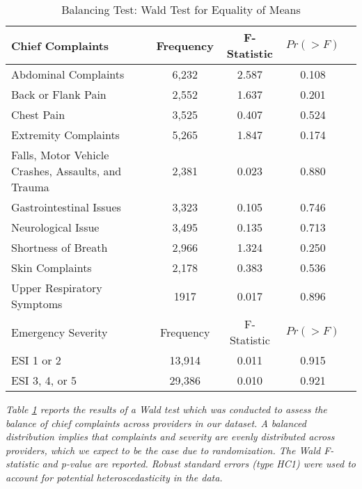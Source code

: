 \documentclass[,mnsc,nonblindrev]{informs}
\begin{document}
\begin{table}[ht]
    \centering
    \caption{Balancing Test: Wald Test for Equality of Means}
    \label{tab:wald_test}
    \begin{threeparttable}
    \begin{tabular}{lcccc}
        \toprule
        Chief Complaints & Frequency & F-Statistic & $Pr(> F)$ \\
        \midrule
        Abdominal Complaints & 6,232 & 2.587 & 0.108 \\ 
        Back or Flank Pain & 2,552 & 1.637 & 0.201 \\ 
        Chest Pain & 3,525 & 0.407 & 0.524 \\ 
        Extremity Complaints & 5,265 & 1.847 & 0.174 \\ 
        Falls, Motor Vehicle Crashes, Assaults, and Trauma & 2,381 & 0.023 & 0.880 \\ 
        Gastrointestinal Issues & 3,323 & 0.105 & 0.746 \\ 
        Neurological Issue & 3,495 & 0.135 & 0.713 \\ 
        Shortness of Breath & 2,966 & 1.324 & 0.250 \\ 
        Skin Complaints & 2,178 & 0.383 & 0.536 \\ 
        Upper Respiratory Symptoms & 1917 & 0.017 & 0.896 \\ 
        \midrule
        Emergency Severity & Frequency & F-Statistic & $Pr(> F)$ \\
        \midrule
        ESI 1 or 2 & 13,914 & 0.011 & 0.915 \\ 
        ESI 3, 4, or 5 & 29,386 & 0.010 & 0.921 \\ 
        \bottomrule
    \end{tabular}
\begin{tablenotes}
\item \textit{Table \ref{tab:wald_test} reports the results of a Wald test which was conducted to assess the balance of chief complaints across providers in our dataset. A balanced distribution implies that complaints and severity are evenly distributed across providers, which we expect to be the case due to randomization. The Wald F-statistic and p-value are reported. Robust standard errors (type HC1) were used to account for potential heteroscedasticity in the data.}
\end{tablenotes}
\end{threeparttable}
\end{table}
\end{document}
